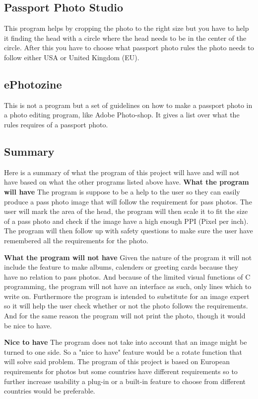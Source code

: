 \subsection{Passport Photo Studio}
This program helps by cropping the photo to the right size but you have to help it finding the head with a circle where the head needs to be in the center of the circle. After this you have to choose what passport photo rules the photo needs to follow either USA or United Kingdom (EU).\citep{PPS}
\newline
\newpage
\subsection{ePhotozine}
This is not a program but a set of guidelines on how to make a passport photo in a photo editing program, like Adobe Photo-shop. It gives a list over what the rules requires of a passport photo.\citep{ePz}
\newline

\subsection{Summary}
Here is a summary of what the program of this project will have and will not have based on what the other programs listed above have.
\newline\newline
\textbf{What the program will have}
\newline
The program is suppose to be a help to the user so they can easily produce a pass photo image that will follow the requirement for pass photos. The user will mark the area of the head, the program will then scale it to fit the size of a pass photo and check if the image have a high enough PPI (Pixel per inch). The program will then follow up with safety questions to make sure the user have remembered all the requirements for the photo.
\newline

\textbf{What the program will not have}
\newline
Given the nature of the program it will not include the feature to make albums, calenders or greeting cards because they have no relation to pass photos. And because of the limited visual functions of C programming, the program will not have an interface as such, only lines which to write on. Furthermore the program is intended to substitute for an image expert so it will help the user check whether or not the photo follows the requirements. And for the same reason the program will not print the photo, though it would be nice to have.
\newline


\textbf{Nice to have}
\newline
The program does not take into account that an image might be turned to one side. So a "nice to have" feature would be a rotate function that will solve said problem. The program of this project is based on European requirements for photos but some countries have different requirements so to further increase usability a plug-in or a built-in feature to choose from different countries would be preferable.


